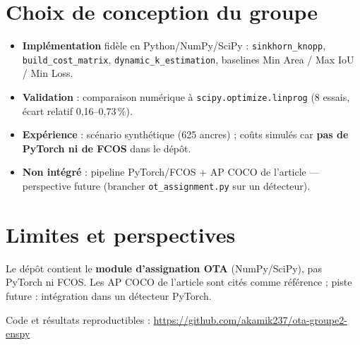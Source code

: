 \documentclass[a4paper,11pt]{article}
\begin{document}
\section*{Choix de conception du groupe}

\begin{itemize}[leftmargin=*]
  \item \textbf{Implémentation} fidèle en Python/NumPy/SciPy : \texttt{sinkhorn\_knopp}, \texttt{build\_cost\_matrix}, \texttt{dynamic\_k\_estimation}, baselines Min Area / Max IoU / Min Loss.
  \item \textbf{Validation} : comparaison numérique à \texttt{scipy.optimize.linprog} (8 essais, écart relatif 0,16--0,73\,\%).
  \item \textbf{Expérience} : scénario synthétique (625 ancres) ; coûts simulés car \textbf{pas de PyTorch ni de FCOS} dans le dépôt.
  \item \textbf{Non intégré} : pipeline PyTorch/FCOS + AP COCO de l'article --- perspective future (brancher \texttt{ot\_assignment.py} sur un détecteur).
\end{itemize}

\section*{Limites et perspectives}

Le dépôt contient le \textbf{module d'assignation OTA} (NumPy/SciPy), pas PyTorch ni FCOS. Les AP COCO de l'article sont cités comme référence ; piste future : intégration dans un détecteur PyTorch.

\vfill
\begin{center}
\small
Code et résultats reproductibles : \url{https://github.com/akamik237/ota-groupe2-enspy}
\end{center}
\end{document}
